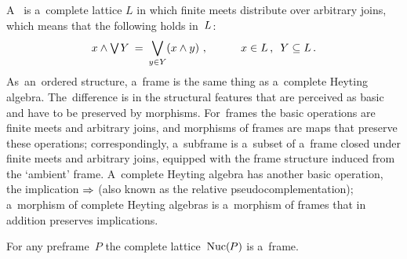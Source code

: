 \documentclass[11pt,letterpaper]{article}
\renewcommand{\thmskip}{\bigskip}
\renewcommand{\interskip}{\medskip}
\begin{document}
A~ is a~complete lattice $L$
in which finite meets distribute over arbitrary joins,
which means that the following  holds in~$L\mspace{1mu}$:
%
\begin{equation*}
x\meet\tJoin\negtinysp Y \Eq \Join_{y\in Y}(x\meet y)~,
	\qquad\quad \text{$x\in L$\,, \ $Y\subseteq L$}\,.
\vspace{-1ex}
\end{equation*}
%
As~an~ordered structure, a~frame is the same thing as a~complete Heyting algebra.
The~difference is in the structural features that are perceived as basic
and have to be preserved by morphisms.
For~frames the basic operations are finite meets and arbitrary joins,
and morphisms of frames are maps that preserve these operations;
correspondingly, a~subframe is a~subset of a~frame
closed under finite meets and arbitrary joins,
equipped with the frame structure induced from the `ambient' frame.
A~complete Heyting algebra has another basic operation, the implication $\mathbin{\Rightarrow}$
	(also known as the relative pseudocomplementation);
a~morphism of complete Heyting algebras is a~morphism of frames
that in addition preserves implications.

\thmskip

\begin{proposition}\label{prop:frame-of-nuclei-on-preframe}
For any preframe\/~$P$ the complete lattice\/~$\mathop{\smash{\mathrm{Nuc}}}\nolimits(\mspace{-1mu} P)$ is a~frame.
\end{proposition}

\interskip
\end{document}

